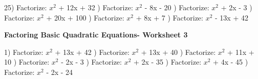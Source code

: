 \documentclass{article}%
\begin{document}
25) Factorize: $x^2$ + 12x + 32%
\newline%
\newline%
) Factorize: $x^2$ - 8x - 20%
\newline%
\newline%
) Factorize: $x^2$ + 2x - 3%
\newline%
\newline%
) Factorize: $x^2$ + 20x + 100%
\newline%
\newline%
) Factorize: $x^2$ + 8x + 7%
\newline%
\newline%
) Factorize: $x^2$ - 13x + 42%
\newline%
\newline%
\newline%
\pagebreak%
\large%
\begin{center}%
\textbf{Factoring Basic Quadratic Equations- Worksheet 3}%
\newline%
\newline%
\newline%
\end{center} \normalsize%
1) Factorize: $x^2$ + 13x + 42%
\newline%
\newline%
) Factorize: $x^2$ + 13x + 40%
\newline%
\newline%
) Factorize: $x^2$ + 11x + 10%
\newline%
\newline%
) Factorize: $x^2$ - 2x - 3%
\newline%
\newline%
) Factorize: $x^2$ + 2x - 35%
\newline%
\newline%
) Factorize: $x^2$ + 4x - 45%
\newline%
\newline%
) Factorize: $x^2$ - 2x - 24%
\newline%
\end{document}
